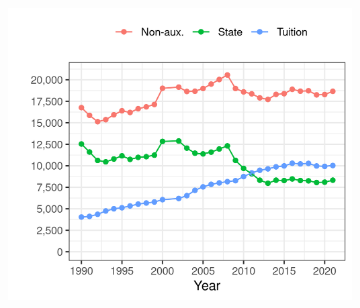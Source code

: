 \begin{figure}[h!]
\begin{subfigure}[b]{0.495\textwidth}
        \includegraphics[width=\textwidth]{figures/mean-funding-fte.png}
        \label{fig:mean-funding-fte}
    \end{subfigure}
    \label{fig:funding}
\end{figure}

